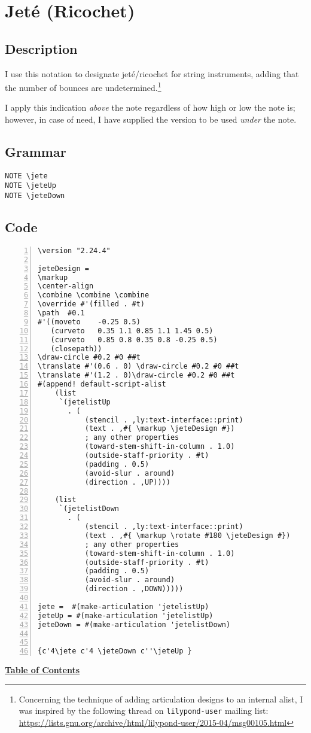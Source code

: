 

\section {Jeté (Ricochet)}
\hfill
{}
\hfill

\subsection{Description}
I use this notation to designate jeté/ricochet for string instruments, adding that the number of bounces are undetermined.\footnote{Concerning the technique of adding articulation designs to an internal alist, I was inspired by the following thread on \Verb|lilypond-user| mailing list: \url{https://lists.gnu.org/archive/html/lilypond-user/2015-04/msg00105.html}}  

I apply this indication \textit{above} the note regardless of how high or low the note is; however, in case of need, I have supplied the version to be used \textit{under} the note.
\subsection{Grammar}
\begin{verbatim}
NOTE \jete
NOTE \jeteUp
NOTE \jeteDown
\end{verbatim}
\subsection{Code}
\begin{Verbatim}[numbers=left,xleftmargin=5mm]
\version "2.24.4"

jeteDesign =
\markup
\center-align
\combine \combine \combine
\override #'(filled . #t)
\path  #0.1
#'((moveto    -0.25 0.5)
   (curveto   0.35 1.1 0.85 1.1 1.45 0.5)
   (curveto   0.85 0.8 0.35 0.8 -0.25 0.5)
   (closepath))
\draw-circle #0.2 #0 ##t
\translate #'(0.6 . 0) \draw-circle #0.2 #0 ##t
\translate #'(1.2 . 0)\draw-circle #0.2 #0 ##t
#(append! default-script-alist
    (list
     `(jetelistUp
       . (
           (stencil . ,ly:text-interface::print)
           (text . ,#{ \markup \jeteDesign #})
           ; any other properties
           (toward-stem-shift-in-column . 1.0)
           (outside-staff-priority . #t)
           (padding . 0.5)
           (avoid-slur . around)
           (direction . ,UP))))

    (list
     `(jetelistDown
       . (
           (stencil . ,ly:text-interface::print)
           (text . ,#{ \markup \rotate #180 \jeteDesign #})
           ; any other properties
           (toward-stem-shift-in-column . 1.0)
           (outside-staff-priority . #t)
           (padding . 0.5)
           (avoid-slur . around)
           (direction . ,DOWN)))))

jete =  #(make-articulation 'jetelistUp)
jeteUp = #(make-articulation 'jetelistUp)
jeteDown = #(make-articulation 'jetelistDown)


{c'4\jete c'4 \jeteDown c''\jeteUp }
\end{Verbatim}
\hyperref[sec:toc]{\textbf{Table of Contents}}
\vfill \break



